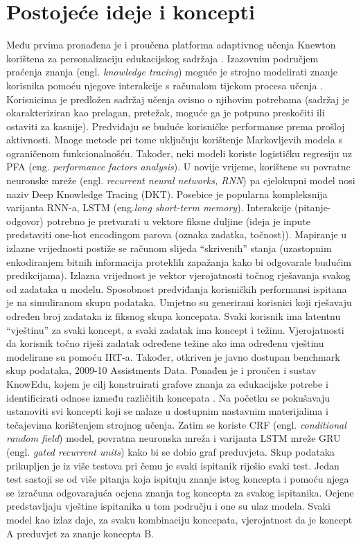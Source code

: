 \documentclass[times, utf8,projekt]{fer}
\begin{document}
\chapter{Postojeće ideje i koncepti}
Među prvima pronađena je i proučena platforma adaptivnog učenja Knewton korištena za personalizaciju edukacijskog sadržaja \citep{ct1}. 
\newline
\newline
Izazovnim područjem praćenja znanja (engl. \textit{knowledge tracing}) moguće je strojno modelirati znanje korisnika pomoću njegove interakcije s računalom tijekom procesa učenja \citep{ct2}. Korisnicima je predložen sadržaj učenja ovisno o njihovim potrebama (sadržaj je okarakteriziran kao prelagan, pretežak, moguće ga je potpuno preskočiti ili ostaviti za kasnije). Predviđaju se buduće korisničke performanse prema prošloj aktivnosti. Mnoge metode pri tome uključuju korištenje Markovljevih modela s ograničenom funkcionalnošću. Također, neki modeli koriste logističku regresiju uz PFA (eng. \textit{performance factors analysis}). U novije vrijeme, korištene su povratne neuronske mreže (engl. \textit{recurrent neural networks, RNN}) pa cjelokupni model nosi naziv Deep Knowledge Tracing (DKT). Posebice je popularna kompleksnija varijanta RNN-a, LSTM (eng.\textit{long short-term memory}). Interakcije (pitanje-odgovor) potrebno je pretvarati u vektore fiksne duljine (ideja je inpute predstaviti one-hot encodingom parova (oznaka zadatka, točnost)). Mapiranje u izlazne vrijednosti postiže se računom slijeda “skrivenih” stanja (uzastopnim enkodiranjem bitnih informacija proteklih zapažanja kako bi odgovarale budućim predikcijama). Izlazna vrijednost je vektor vjerojatnosti točnog rješavanja svakog od zadataka u modelu. 
Sposobnost predviđanja korisničkih performansi ispitana je na simuliranom skupu podataka. Umjetno su generirani korisnici koji rješavaju određen broj zadataka iz fiksnog skupa koncepata. Svaki korisnik ima latentnu “vještinu” za svaki koncept, a svaki zadatak ima koncept i težinu. Vjerojatnosti da korisnik točno riješi zadatak određene težine ako ima određenu vještinu modelirane su pomoću IRT-a. Također, otkriven je javno dostupan benchmark skup podataka, 2009-10 Assistments Data.
\newline
\newline
Ponađen je i proučen i sustav KnowEdu, kojem je cilj konstruirati grafove znanja za edukacijske potrebe i identificirati odnose između različitih koncepata \citep{ct3}.
Na početku se pokušavaju ustanoviti svi koncepti koji se nalaze u dostupnim nastavnim materijalima i tečajevima korištenjem strojnog učenja. Zatim se koriste CRF (engl. \textit{conditional random field}) model, povratna neuronska mreža i varijanta LSTM mreže GRU (engl. \textit{gated recurrent units}) kako bi se dobio graf preduvjeta. Skup podataka prikupljen je iz više testova pri čemu je svaki ispitanik riješio svaki test. Jedan test sastoji se od više pitanja koja ispituju znanje istog koncepta i pomoću njega se izračuna odgovarajuća ocjena znanja tog koncepta za svakog ispitanika. Ocjene predstavljaju vještine ispitanika u tom području i one su ulaz modela. Svaki model kao izlaz daje, za svaku kombinaciju koncepata, vjerojatnost da je koncept A preduvjet za znanje koncepta B.
\end{document}
